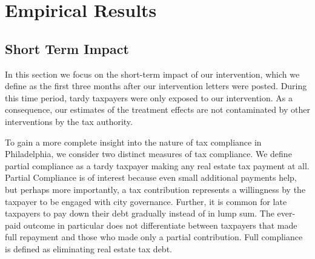 \documentclass[12pt]{article}
\begin{document}
\section{Empirical Results}

\subsection{Short Term Impact}

In this section we focus on the short-term impact of our
intervention, which we define as the first three months after
our intervention letters were posted. During this time period, tardy taxpayers were only
exposed to our intervention. As a consequence, our estimates of the
treatment effects are not contaminated by other interventions
by the tax authority.

To gain a more complete insight into the nature of tax compliance in Philadelphia, we
consider two distinct measures of tax compliance. We define partial
compliance as a tardy taxpayer making any real estate tax payment at all.
Partial Compliance is of interest because even small additional
payments help, but perhaps more importantly, a tax contribution
represents a willingness by the taxpayer to be engaged with city
governance.  Further, it is common for late taxpayers to pay down their
debt gradually instead of in lump sum. The ever-paid outcome 
in particular does not differentiate between
taxpayers that made full repayment and those who made only a partial
contribution.  Full compliance is defined as eliminating real estate tax debt.
\end{document}
